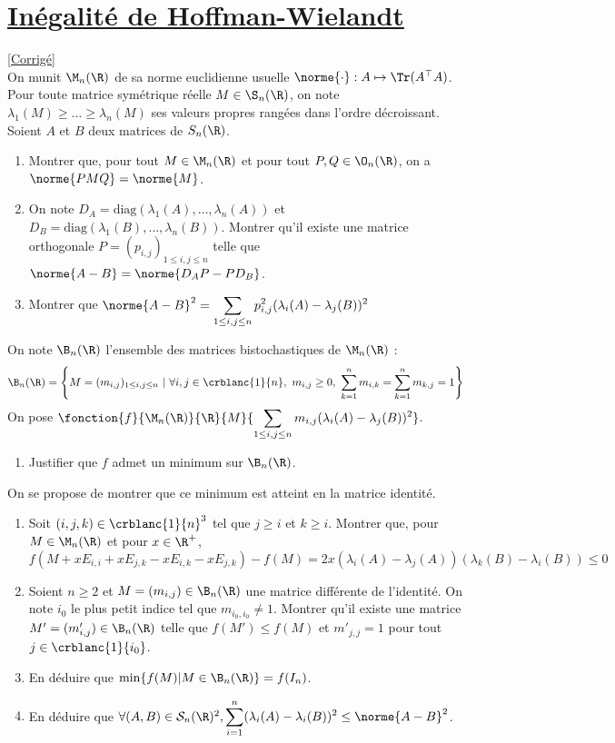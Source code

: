 \documentclass[8pt]{book}
\begin{document}
\section{\underline{Inégalité de Hoffman-Wielandt} }
\label{Inégalité de Hoffman-Wielandt}
\textcolor{blue}{\hyperref[Inégalité de Hoffman-Wielandt corrigé]{[Corrigé]}}\\
On munit $\M_n(\R)$ de sa norme euclidienne usuelle $\norme{\cdot}:A\mapsto \Tr(A^\top A)$.
\\Pour toute matrice symétrique réelle $M\in \S_n(\R)$, on note $\lambda_1(M)\geq\dots\geq\lambda_n(M)$ ses valeurs propres rangées dans l'ordre décroissant.
\\Soient $A$ et $B$ deux matrices de $S_n(\R)$.
\begin{enumerate}
	\item Montrer que, pour tout $M\in\M_n(\R)$ et pour tout $P,Q\in \O_n(\R)$, on a $\norme{PMQ}=\norme{M}$.
	\item On note $D_A=\text{diag}(\lambda_1(A),\dots,\lambda_n(A))$ et $D_B=\text{diag}(\lambda_1(B),\dots,\lambda_n(B))$. Montrer qu'il existe une matrice orthogonale $P=(p_{i,j})_{1\leq i,j\leq n}$ telle que $\norme{A-B}=\norme{D_AP-PD_B}$.
	\item Montrer que $\norme{A-B}^2=\displaystyle\sum\limits_{1\leq i,j\leq n}p_{i,j}^2(\lambda_i(A)-\lambda_j(B))^2$
\end{enumerate}
On note $\B_n(\R)$ l'ensemble des matrices bistochastiques de $\M_n(\R)$ :
$$\B_n(\R)=\left\{M=(m_{i,j})_{1\leq i,j\leq n}\ |\ \forall i,j\in \crblanc{1}{n},\ m_{i,j}\geq 0,\ \sum_{k=1}^nm_{i,k}=\sum_{k=1}^nm_{k,j}=1\right\}$$
On pose $\fonction{f}{\M_n(\R)}{\R}{M}{\displaystyle\sum\limits_{1\leq i,j\leq n }m_{i,j}(\lambda_i(A)-\lambda_j(B))^2}$.
\begin{enumerate}[resume]
	\item Justifier que $f$ admet un minimum sur $\B_n(\R)$.
\end{enumerate}
On se propose de montrer que ce minimum est atteint en la matrice identité.
\begin{enumerate}[resume]
	\item Soit $(i,j,k)\in\crblanc{1}{n}^3$ tel que $j\geq i$ et $k\geq i$. Montrer que, pour $M\in\M_n(\R)$ et pour $x\in\R^+$, $$f(M+xE_{i,i}+xE_{j,k}-xE_{i,k}-xE_{j,k})-f(M)=2x(\lambda_i(A)-\lambda_j(A))(\lambda_k(B)-\lambda_i(B))\leq 0$$
	\item Soient $n\geq 2$ et $M=(m_{i,j})\in\B_n(\R)$ une matrice différente de l'identité. On note $i_0$ le plus petit indice tel que $m_{i_0,i_0}\ne 1$. Montrer qu'il existe une matrice $M'=(m_{i,j}')\in\B_n(\R)$ telle que $f(M')\leq f(M)$ et $m'_{j,j}=1$ pour tout $j\in\crblanc{1}{i_0}$.
	\item En déduire que $\min\{f(M)|M\in\B_n(\R)\}=f(I_n)$.
	\item En déduire que $\forall (A,B)\in\mathcal{S}_n(\R)^2, \displaystyle\sum\limits_{i=1}^n(\lambda_i(A)-\lambda_i(B))^2\leq\norme{A-B}^2$.
\end{enumerate}
\end{document}
